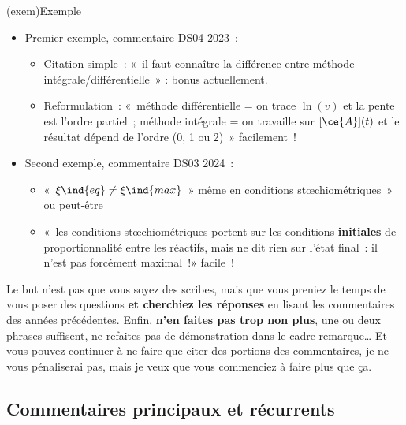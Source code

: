 \documentclass[a4paper, 10pt, final, garamond]{book}
\begin{document}
\begin{tcn}(exem){Exemple}
	\begin{itemize}
		\item Premier exemple, commentaire DS04 2023~:
		      \begin{itemize}
			      \item Citation simple~: «~il faut connaître la différence entre
			            méthode intégrale/différentielle~» :
			             bonus actuellement.
			      \item Reformulation~: «~méthode différentielle = on trace $\ln (v)$
			            et la pente est l'ordre partiel~; méthode intégrale = on travaille
			            sur
			            $[\ce{A}](t)$ et le résultat dépend de l'ordre (0, 1 ou 2)~»
			            facilement~!
		      \end{itemize}
		\item Second exemple, commentaire DS03 2024~:
		      \begin{itemize}
			      \item «~$\xi\ind{eq} \neq \xi\ind{max}$~» même en conditions
			            stœchiométriques~»  ou peut-être 
			      \item «~les conditions stœchiométriques portent sur les conditions
			            \textbf{initiales} de proportionnalité entre les réactifs,
			            mais ne dit
			            rien sur l'état final~: il n'est pas forcément maximal~!»
			            facile~!
		      \end{itemize}
	\end{itemize}
\end{tcn}

Le but n'est pas que vous soyez des scribes, mais que vous preniez le temps de
vous poser des questions \textbf{et cherchiez les réponses} en lisant les
commentaires des années précédentes. Enfin, \textbf{n'en faites pas trop non
	plus}, une ou deux phrases suffisent, ne refaites pas de démonstration dans le
cadre remarque… Et vous pouvez continuer à ne faire que citer des portions des
commentaires, je ne vous pénaliserai pas, mais je veux que vous commenciez à
faire plus que ça.

\subsection{Commentaires principaux et récurrents}

\end{document}
